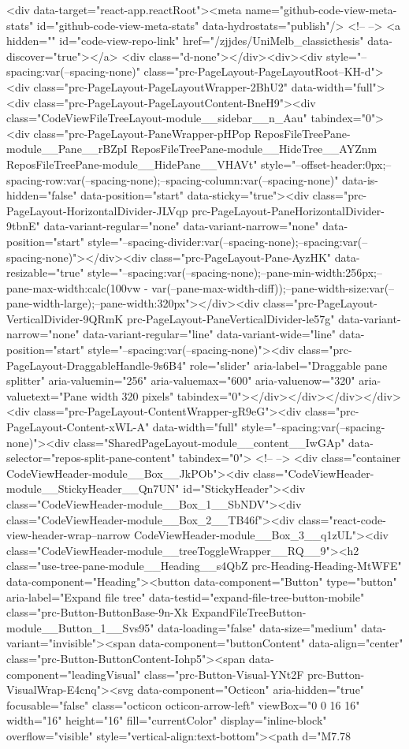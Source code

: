 {{{{{  <div data-target="react-app.reactRoot"><meta name="github-code-view-meta-stats" id="github-code-view-meta-stats" data-hydrostats="publish"/> <!-- --> <a hidden="" id="code-view-repo-link" href="/zjjdes/UniMelb_classicthesis" data-discover="true"></a> <div class="d-none"></div><div><div style="--spacing:var(--spacing-none)" class="prc-PageLayout-PageLayoutRoot--KH-d"><div class="prc-PageLayout-PageLayoutWrapper-2BhU2" data-width="full"><div class="prc-PageLayout-PageLayoutContent-BneH9"><div class="CodeViewFileTreeLayout-module__sidebar__n_Aau" tabindex="0"><div class="prc-PageLayout-PaneWrapper-pHPop ReposFileTreePane-module__Pane__rBZpI ReposFileTreePane-module__HideTree__AYZnm ReposFileTreePane-module__HidePane__VHAVt" style="--offset-header:0px;--spacing-row:var(--spacing-none);--spacing-column:var(--spacing-none)" data-is-hidden="false" data-position="start" data-sticky="true"><div class="prc-PageLayout-HorizontalDivider-JLVqp prc-PageLayout-PaneHorizontalDivider-9tbnE" data-variant-regular="none" data-variant-narrow="none" data-position="start" style="--spacing-divider:var(--spacing-none);--spacing:var(--spacing-none)"></div><div class="prc-PageLayout-Pane-AyzHK" data-resizable="true" style="--spacing:var(--spacing-none);--pane-min-width:256px;--pane-max-width:calc(100vw - var(--pane-max-width-diff));--pane-width-size:var(--pane-width-large);--pane-width:320px"></div><div class="prc-PageLayout-VerticalDivider-9QRmK prc-PageLayout-PaneVerticalDivider-le57g" data-variant-narrow="none" data-variant-regular="line" data-variant-wide="line" data-position="start" style="--spacing:var(--spacing-none)"><div class="prc-PageLayout-DraggableHandle-9s6B4" role="slider" aria-label="Draggable pane splitter" aria-valuemin="256" aria-valuemax="600" aria-valuenow="320" aria-valuetext="Pane width 320 pixels" tabindex="0"></div></div></div></div><div class="prc-PageLayout-ContentWrapper-gR9eG"><div class="prc-PageLayout-Content-xWL-A" data-width="full" style="--spacing:var(--spacing-none)"><div class="SharedPageLayout-module__content__IwGAp" data-selector="repos-split-pane-content" tabindex="0"> <!-- --> <div class="container CodeViewHeader-module__Box__JkPOb"><div class="CodeViewHeader-module__StickyHeader__Qn7UN" id="StickyHeader"><div class="CodeViewHeader-module__Box_1__SbNDV"><div class="CodeViewHeader-module__Box_2__TB46f"><div class="react-code-view-header-wrap--narrow CodeViewHeader-module__Box_3__q1zUL"><div class="CodeViewHeader-module__treeToggleWrapper__RQ__9"><h2 class="use-tree-pane-module__Heading__s4QbZ prc-Heading-Heading-MtWFE" data-component="Heading"><button data-component="Button" type="button" aria-label="Expand file tree" data-testid="expand-file-tree-button-mobile" class="prc-Button-ButtonBase-9n-Xk ExpandFileTreeButton-module__Button_1__Svs95" data-loading="false" data-size="medium" data-variant="invisible"><span data-component="buttonContent" data-align="center" class="prc-Button-ButtonContent-Iohp5"><span data-component="leadingVisual" class="prc-Button-Visual-YNt2F prc-Button-VisualWrap-E4cnq"><svg data-component="Octicon" aria-hidden="true" focusable="false" class="octicon octicon-arrow-left" viewBox="0 0 16 16" width="16" height="16" fill="currentColor" display="inline-block" overflow="visible" style="vertical-align:text-bottom"><path d="M7.78 }}}}}
